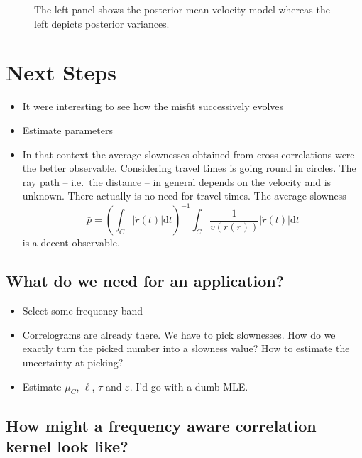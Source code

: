 \documentclass[11pt]{article}
\begin{document}
\begin{figure}
    \centering
    
    \caption{The left panel shows the posterior mean velocity model whereas the left depicts posterior variances. }
    \label{fig:example}
\end{figure}


\section{Next Steps}

\begin{itemize}
    \item It were interesting to see how the misfit successively evolves
    \item Estimate parameters
    \item In that context the average slownesses obtained from cross correlations were the better observable.
        Considering travel times is going round in circles.
        The ray path -- i.e.~the distance -- in general depends on the velocity and is unknown.
        There actually is no need for travel times.
        The average slowness
        \begin{equation}
            \bar p = \left(\int_C |\acute r(t)| \mathrm d t \right)^{-1} \int_C \frac 1 {v(r(r))} |\acute r(t)| \mathrm d t
        \end{equation}
        is a decent observable.

\end{itemize}

\subsection{What do we need for an application?}

\begin{itemize}
    \item Select some frequency band
    \item Correlograms are already there. We have to pick slownesses. How do we exactly turn the picked number into a slowness value? How to estimate the uncertainty at picking?
    \item Estimate $\mu_C$, $\ell$, $\tau$ and $\varepsilon$. I'd go with a dumb MLE.
\end{itemize}

\subsection{How might a frequency aware correlation kernel look like?}
\end{document}
